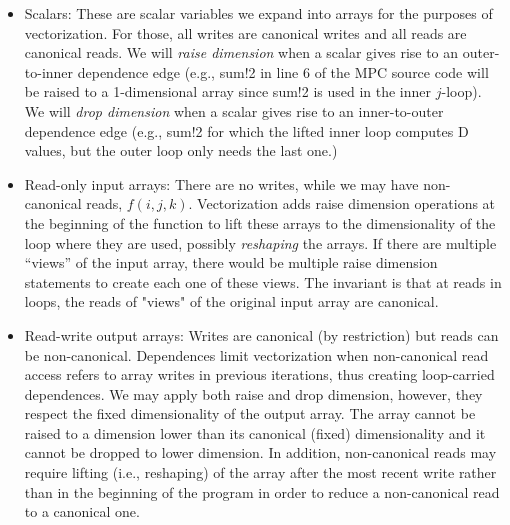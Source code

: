 \begin{itemize}
\item Scalars: These are scalar variables we expand into arrays for the purposes of vectorization.
For those, all writes are canonical writes and all reads are canonical reads. We will \emph{raise dimension} when
a scalar gives rise to an outer-to-inner dependence edge (e.g., {\sf sum!2} in line 6 of the MPC source code will be raised to a 1-dimensional
array since {\sf sum!2} is used in the inner $j$-loop). We will \emph{drop dimension} when a scalar
gives rise to an inner-to-outer dependence edge (e.g., {\sf sum!2} for which the lifted inner loop computes
{\sf D} values, but the outer loop only needs the last one.)

\item Read-only input arrays: There are no writes, while we may have non-canonical reads, $f(i,j,k)$.
Vectorization adds raise dimension operations at the beginning of the function to lift these arrays to 
the dimensionality of the loop where they are used, possibly \emph{reshaping} the arrays. 
If there are multiple ``views'' of the input array, there would be multiple raise dimension statements to create
each one of these views. The invariant is that at reads in loops, the reads of "views" of the original input array are canonical.

 \item Read-write output arrays: Writes are canonical (by restriction) but reads can be non-canonical.
 Dependences limit vectorization when non-canonical read access refers to array writes in
 previous iterations, thus creating loop-carried dependences. We may apply both raise and drop dimension, however,
 they respect the fixed dimensionality of the output array. The array cannot be raised to a dimension lower than
 its canonical (fixed) dimensionality and it cannot be dropped to lower dimension. In addition, non-canonical reads may
 require lifting (i.e., reshaping) of the array after the most recent write rather than in the beginning of the program
 in order to reduce a non-canonical read to a canonical one.

\end{itemize}


